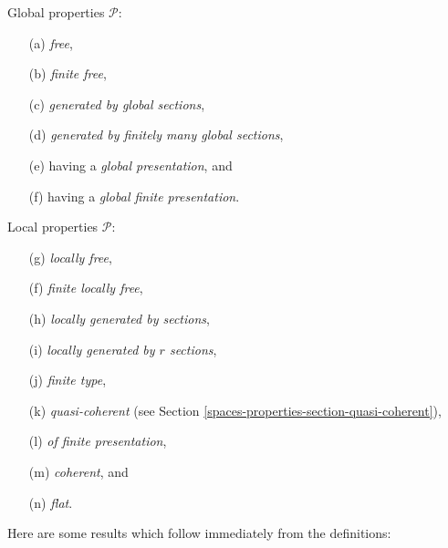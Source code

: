 \medskip\noindent
Global properties $\mathcal{P}$:
\begin{enumerate}
\item[(a)] {\it free},
\item[(b)] {\it finite free},
\item[(c)] {\it generated by global sections},
\item[(d)] {\it generated by finitely many global sections},
\item[(e)] having a {\it global presentation}, and
\item[(f)] having a {\it global finite presentation}.
\end{enumerate}
Local properties $\mathcal{P}$:
\begin{enumerate}
\item[(g)] {\it locally free},
\item[(f)] {\it finite locally free},
\item[(h)] {\it locally generated by sections},
\item[(i)] {\it locally generated by $r$ sections},
\item[(j)] {\it finite type},
\item[(k)] {\it quasi-coherent} (see Section \ref{spaces-properties-section-quasi-coherent}),
\item[(l)] {\it of finite presentation},
\item[(m)] {\it coherent}, and
\item[(n)] {\it flat}.
\end{enumerate}
Here are some results which follow immediately from the definitions:
